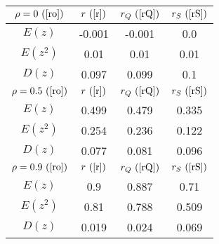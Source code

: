 \begin{tabular}{|c|c|c|c|}
\hline
$\rho = 0~(\ref{ro})$ & $r ~(\ref{r})$ & $r_Q ~(\ref{rQ})$ & $r_S ~(\ref{rS})$\\
\hline
$E(z)$ & -0.001 & -0.001 & 0.0\\
\hline
$E(z^2)$ & 0.01 & 0.01 & 0.01\\
\hline
$D(z)$ & 0.097 & 0.099 & 0.1\\
\hline
$\rho = 0.5~(\ref{ro})$ & $r ~(\ref{r})$ & $r_Q ~(\ref{rQ})$ & $r_S ~(\ref{rS})$\\
\hline
$E(z)$ & 0.499 & 0.479 & 0.335\\
\hline
$E(z^2)$ & 0.254 & 0.236 & 0.122\\
\hline
$D(z)$ & 0.077 & 0.081 & 0.096\\
\hline
$\rho = 0.9~(\ref{ro})$ & $r ~(\ref{r})$ & $r_Q ~(\ref{rQ})$ & $r_S ~(\ref{rS})$\\
\hline
$E(z)$ & 0.9 & 0.887 & 0.71\\
\hline
$E(z^2)$ & 0.81 & 0.788 & 0.509\\
\hline
$D(z)$ & 0.019 & 0.024 & 0.069\\
\hline
\end{tabular}